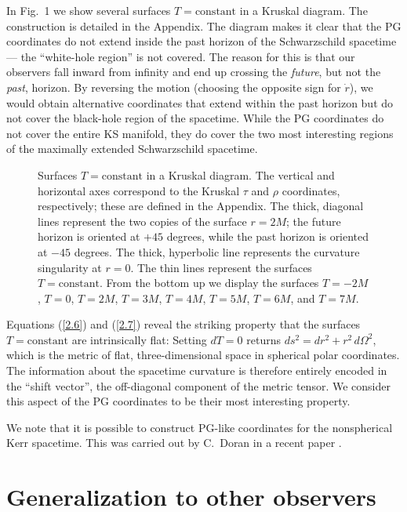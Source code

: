 In Fig.~1 we show several surfaces $T = \mbox{constant}$ in a Kruskal 
diagram. The construction is detailed in the Appendix. The diagram
makes it clear that the PG coordinates do not extend inside the past
horizon of the Schwarzschild spacetime --- the ``white-hole region''
is not covered. The reason for this is that our observers fall inward
from infinity and end up crossing the {\it future}, but not the 
{\it past}, horizon. By reversing the motion (choosing the opposite
sign for $\dot{r}$), we would obtain alternative coordinates that
extend within the past horizon but do not cover the black-hole region
of the spacetime. While the PG coordinates do not cover the entire KS
manifold, they do cover the two most interesting regions of the
maximally extended Schwarzschild spacetime.  

\begin{figure}
\vspace*{2.5in}
\caption{Surfaces $T = \mbox{constant}$ in a Kruskal diagram. The
vertical and horizontal axes correspond to the Kruskal $\tau$ and
$\rho$ coordinates, respectively; these are defined in the
Appendix. The thick, diagonal lines represent the two copies of the
surface $r = 2M$; the future horizon is oriented at $+45$ degrees,
while the past horizon is oriented at $-45$ degrees. The thick,
hyperbolic line represents the curvature singularity at $r=0$. The
thin lines represent the surfaces $T = \mbox{constant}$. From the
bottom up we display the surfaces $T=-2M$, $T=0$, $T=2M$, $T=3M$,
$T=4M$, $T=5M$, $T=6M$, and $T=7M$.} 
\end{figure}

Equations (\ref{2.6}) and (\ref{2.7}) reveal the striking property
that the surfaces $T = \mbox{constant}$ are intrinsically flat:  
Setting $dT = 0$ returns $ds^2 = dr^2 + r^2\, d\Omega^2$, which is the 
metric of flat, three-dimensional space in spherical polar
coordinates. The information about the spacetime curvature is
therefore entirely encoded in the ``shift vector'', the off-diagonal  
component of the metric tensor. We consider this aspect of the PG
coordinates to be their most interesting property.      

We note that it is possible to construct PG-like coordinates for the
nonspherical Kerr spacetime. This was carried out by C.~Doran in a
recent paper \cite{D}. 

\section{Generalization to other observers} 

